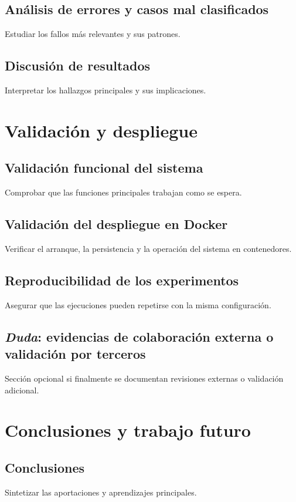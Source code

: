\documentclass[11pt,spanish,listoffigures,listoftables]{tfgetsinf}
\begin{document}
\section{Análisis de errores y casos mal clasificados}
Estudiar los fallos más relevantes y sus patrones.

\section{Discusión de resultados}
Interpretar los hallazgos principales y sus implicaciones.

\chapter{Validación y despliegue}
\section{Validación funcional del sistema}
Comprobar que las funciones principales trabajan como se espera.

\section{Validación del despliegue en Docker}
Verificar el arranque, la persistencia y la operación del sistema en contenedores.

\section{Reproducibilidad de los experimentos}
Asegurar que las ejecuciones pueden repetirse con la misma configuración.

\section{\textit{Duda}: evidencias de colaboración externa o validación por terceros}
Sección opcional si finalmente se documentan revisiones externas o validación adicional.

\chapter{Conclusiones y trabajo futuro}
\section{Conclusiones}
Sintetizar las aportaciones y aprendizajes principales.
\end{document}
